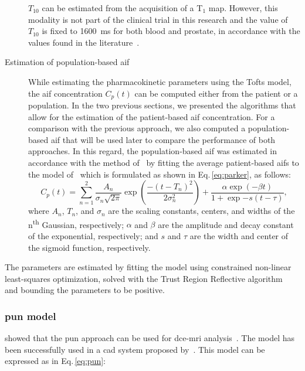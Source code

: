 \begin{description}
      $T_{10}$ can be estimated from the acquisition of a T$_1$ map.
      However, this modality is not part of the clinical trial in this research and the value of $T_{10}$ is fixed to \SI{1600}{\ms} for both blood and prostate, in accordance with the values found in the literature~\citep{fennessy2015quantitative,de2004mr,carr2011magnetic}.
      \item[Estimation of population-based \ac{aif}] While estimating
        the pharmacokinetic parameters using the Tofts model, the \ac{aif} concentration $C_p(t)$ can be computed either from the patient or a population.
        In the two previous sections, we presented the algorithms that
        allow for the estimation of the patient-based \ac{aif} concentration.
        For a comparison with the previous approach, we also computed a population-based \ac{aif} that will be used later to compare the performance of both approaches.
        In this regard, the population-based \ac{aif} was estimated in
        accordance with the method of~\citep{meng2010comparison} by
        fitting the average patient-based \ac{aif}s to the model
        of~\cite{parker2006experimentally} which is formulated as
        shown in Eq.\,\eqref{eq:parker}, as follows:
        \begin{equation}
          C_p(t) = \sum_{n=1}^{2} \frac{A_n}{\sigma_n \sqrt{2 \pi}} \exp\left(\frac{- (t- T_n)^2}{2\sigma_{n}^{2}}\right) + \frac{\alpha \exp(-\beta t)}{1 + \exp{-s (t - \tau)}} ,
          \label{eq:parker}
        \end{equation}
        \noindent where $A_n$, $T_n$, and $\sigma_n$ are the scaling
        constants, centers, and widths of the n\textsuperscript{th}
        Gaussian, respectively; $\alpha$ and $\beta$ are the amplitude
        and decay constant of the exponential, respectively; and $s$ and $\tau$ are the width and center of the sigmoid function, respectively.
\end{description}

The parameters are estimated by fitting the model using constrained non-linear least-squares optimization, solved with the Trust Region Reflective algorithm~\citep{sorensen1982newton} and bounding the parameters to be positive.

\subsubsection{\acs*{pun} model}\label{sec:pun}

\citeauthor{gliozzi2011phenomenological} showed that the \ac{pun} approach can be used for \ac{dce}-\ac{mri} analysis~\citep{gliozzi2011phenomenological}.
The model has been successfully used in a \ac{cad} system proposed by~\cite{giannini2015fully}.
This model can be expressed as in Eq.\,\eqref{eq:pun}:

